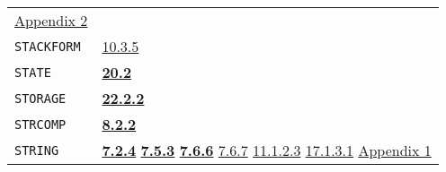 \documentclass[a4paper]{scrbook}
\begin{document}
\begin{longtable}[]{@{}ll@{}}
\begin{minipage}[t]{0.70\columnwidth}
\href{appendix-2-predefined-subroutines.md\#appendix-2-predefined-subroutines}{Appendix 2}\strut
\end{minipage}\tabularnewline
\begin{minipage}[t]{0.24\columnwidth}\raggedright\strut
\texttt{STACKFORM}\strut
\end{minipage} & \begin{minipage}[t]{0.70\columnwidth}\raggedright\strut
\href{10-looping.md\#1035-stackform}{10.3.5}\strut
\end{minipage}\tabularnewline
\begin{minipage}[t]{0.24\columnwidth}\raggedright\strut
\texttt{STATE}\strut
\end{minipage} & \begin{minipage}[t]{0.70\columnwidth}\raggedright\strut
\textbf{\href{20-coroutines.md\#202-state-of-a-process}{20.2}}\strut
\end{minipage}\tabularnewline
\begin{minipage}[t]{0.24\columnwidth}\raggedright\strut
\texttt{STORAGE}\strut
\end{minipage} & \begin{minipage}[t]{0.70\columnwidth}\raggedright\strut
\textbf{\href{22-storage-management.md\#2222-non-garbage-collected-storage-the-primtype}{22.2.2}}\strut
\end{minipage}\tabularnewline
\begin{minipage}[t]{0.24\columnwidth}\raggedright\strut
\texttt{STRCOMP}\strut
\end{minipage} & \begin{minipage}[t]{0.70\columnwidth}\raggedright\strut
\textbf{\href{08-truth.md\#822-equality-and-membership-1}{8.2.2}}\strut
\end{minipage}\tabularnewline
\begin{minipage}[t]{0.24\columnwidth}\raggedright\strut
\texttt{STRING}\strut
\end{minipage} & \begin{minipage}[t]{0.70\columnwidth}\raggedright\strut
\textbf{\href{07-structured-objects.md\#724-string-1}{7.2.4}}
\textbf{\href{07-structured-objects.md\#753-list-vector-uvector-and-string-the-subrs-1}{7.5.3}}
\textbf{\href{07-structured-objects.md\#766-string-the-primtype-and-character-1}{7.6.6}}
\href{07-structured-objects.md\#767-bytes}{7.6.7} \href{11-input-output.md\#11123-princ}{11.1.2.3}
\href{17-macro-operations.md\#17131-read-finally}{17.1.3.1}
\href{appendix-1-a-look-inside.md\#appendix-1-a-look-inside}{Appendix 1}\strut
\end{minipage}\tabularnewline

\end{longtable}
\end{document}
